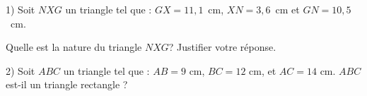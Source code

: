 \begin{minipage}{0.99\linewidth}

\exo



1)  Soit $NXG$ un triangle tel que : $GX=11,1$~cm, $XN=3,6$~cm et $GN=10,5$~cm.\par
  Quelle est la nature du triangle $NXG$? Justifier votre réponse.

2) Soit $ABC$ un triangle tel que : $AB=9$ cm, $BC=12$ cm, et $AC=14$ cm. $ABC$ est-il un triangle rectangle ? 

\end{minipage}

\vspace{0.5cm}

